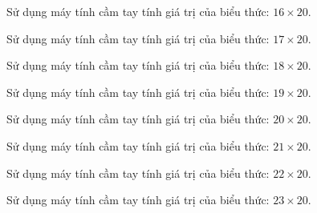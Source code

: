 
\begin{ex}
  Sử dụng máy tính cầm tay tính giá trị của biểu thức: $16 \times 20$.
\end{ex}

\begin{ex}
  Sử dụng máy tính cầm tay tính giá trị của biểu thức: $17 \times 20$.
\end{ex}

\begin{ex}
  Sử dụng máy tính cầm tay tính giá trị của biểu thức: $18 \times 20$.
\end{ex}

\begin{ex}
  Sử dụng máy tính cầm tay tính giá trị của biểu thức: $19 \times 20$.
\end{ex}

\begin{ex}
  Sử dụng máy tính cầm tay tính giá trị của biểu thức: $20 \times 20$.
\end{ex}

\begin{ex}
  Sử dụng máy tính cầm tay tính giá trị của biểu thức: $21 \times 20$.
\end{ex}

\begin{ex}
  Sử dụng máy tính cầm tay tính giá trị của biểu thức: $22 \times 20$.
\end{ex}

\begin{ex}
  Sử dụng máy tính cầm tay tính giá trị của biểu thức: $23 \times 20$.
\end{ex}

